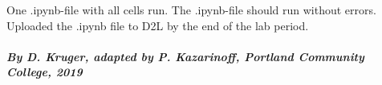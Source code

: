 \documentclass[11pt]{article}
\begin{document}
One .ipynb-file with all cells run. The .ipynb-file should run without
errors. Uploaded the .ipynb file to D2L by the end of the lab period.

    \hypertarget{by-d.-kruger-adapted-by-p.-kazarinoff-portland-community-college-2019}{%
\paragraph{\texorpdfstring{\emph{By D. Kruger, adapted by P. Kazarinoff,
Portland Community College,
2019}}{By D. Kruger, adapted by P. Kazarinoff, Portland Community College, 2019}}\label{by-d.-kruger-adapted-by-p.-kazarinoff-portland-community-college-2019}}


    
    
    
    
\end{document}
